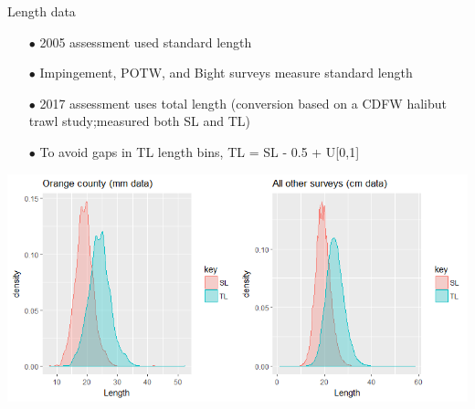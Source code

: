 \documentclass[ignorenonframetext,]{beamer}
\begin{document}
\begin{frame}{Length data}

\begin{itemize}
\item[$\bullet$] 2005 assessment used standard length
\item[$\bullet$] Impingement, POTW, and Bight surveys measure standard length
\item[$\bullet$] 2017 assessment uses total length (conversion based on a CDFW halibut trawl study;measured both SL and TL)
\item[$\bullet$] To avoid gaps in TL length bins, TL = SL - 0.5 + U[0,1] 
\end{itemize}

\includegraphics[height=.5\textheight]{Figures/SL_to_TL_compare.png}

\end{frame}
\end{document}
